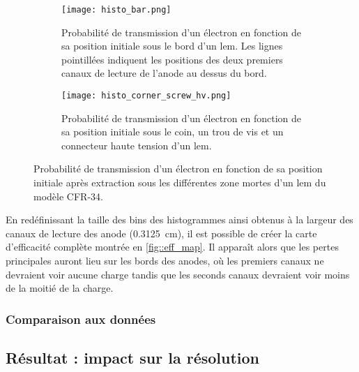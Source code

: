             \begin{figure}[htbp]
                \begin{subfigure}[t]{0.48\textwidth}
                    \texttt{[image: histo\_bar.png]}
                    \caption{Probabilité de transmission d'un électron en fonction de sa position initiale sous le bord d'un \gls{lem}. Les lignes pointillées indiquent les positions des deux premiers canaux de lecture de l'anode au dessus du bord.}
                \end{subfigure}
                \hfill
                \begin{subfigure}[t]{0.48\textwidth}
                    \texttt{[image: histo\_corner\_screw\_hv.png]}
                    \caption{Probabilité de transmission d'un électron en fonction de sa position initiale sous le coin, un trou de vis et un connecteur haute tension d'un \gls{lem}.}
                \end{subfigure}
                \caption[Probabilité de transmission des zones mortes d'un \gls{lem}.]{Probabilité de transmission d'un électron en fonction de sa position initiale après extraction sous les différentes zone mortes d'un \gls{lem} du modèle CFR-34.}
                \label{fig::histo_eff}
            \end{figure}
            
            En redéfinissant la taille des bins des histogrammes ainsi obtenus à la largeur des canaux de lecture des anode (\SI{0.3125}{\centi\meter}), il est possible de créer la carte d'efficacité complète montrée en \autoref{fig::eff_map}. Il apparaît alors que les pertes principales auront lieu sur les bords des anodes, où les premiers canaux ne devraient voir aucune charge tandis que les seconds canaux devraient voir moins de la moitié de la charge.
            
            \subsubsection{Comparaison aux données}
            
            
        \subsection{Résultat : impact sur la résolution}
            
